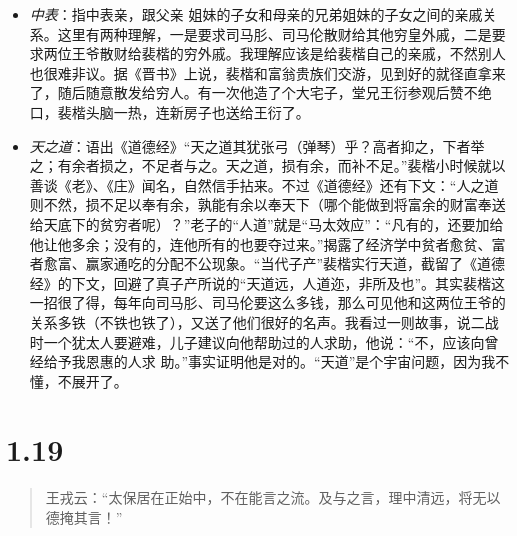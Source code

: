 \documentclass[]{book}
\begin{document}
\begin{itemize}
\item
  \emph{中表}：指中表亲，跟父亲
  姐妹的子女和母亲的兄弟姐妹的子女之间的亲戚关系。这里有两种理解，一是要求司马肜、司马伦散财给其他穷皇外戚，二是要求两位王爷散财给裴楷的穷外戚。我理解应该是给裴楷自己的亲戚，不然别人也很难非议。据《晋书》上说，裴楷和富翁贵族们交游，见到好的就径直拿来了，随后随意散发给穷人。有一次他造了个大宅子，堂兄王衍参观后赞不绝口，裴楷头脑一热，连新房子也送给王衍了。
\item
  \emph{天之道}：语出《道德经》``天之道其犹张弓（弹琴）乎？高者抑之，下者举之；有余者损之，不足者与之。天之道，损有余，而补不足。''裴楷小时候就以善谈《老》、《庄》闻名，自然信手拈来。不过《道德经》还有下文：``人之道则不然，损不足以奉有余，孰能有余以奉天下（哪个能做到将富余的财富奉送给天底下的贫穷者呢）？''老子的``人道''就是``马太效应''：``凡有的，还要加给他让他多余；没有的，连他所有的也要夺过来。''揭露了经济学中贫者愈贫、富者愈富、赢家通吃的分配不公现象。``当代子产''裴楷实行天道，截留了《道德经》的下文，回避了真子产所说的``天道远，人道迩，非所及也''。其实裴楷这一招很了得，每年向司马肜、司马伦要这么多钱，那么可见他和这两位王爷的关系多铁（不铁也铁了），又送了他们很好的名声。我看过一则故事，说二战时一个犹太人要避难，儿子建议向他帮助过的人求助，他说：``不，应该向曾经给予我恩惠的人求
  助。''事实证明他是对的。``天道''是个宇宙问题，因为我不懂，不展开了。
\end{itemize}

\section{1.19}\label{section-18}

\begin{quote}
王戎云：``太保居在正始中，不在能言之流。及与之言，理中清远，将无以德掩其言！''
\end{quote}
\end{document}
